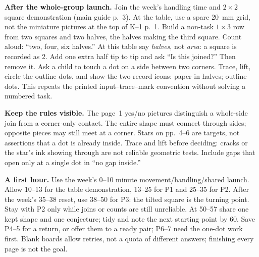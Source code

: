 \documentclass[11pt]{article}
\newcommand{\dotgrid}[2]{\foreach \x in {0,...,#1}{\foreach \y in {0,...,#2}{\fill (\x,\y) circle (1.25pt);}}}
\begin{document}
\textbf{After the whole-group launch.} Join the week's handling time and $2\times2$ square demonstration (main guide p.~3). At the table, use a spare 20~mm grid, not the miniature pictures at the top of K--1 p.~1. Build a non-task $1\times3$ row from two squares and two halves, the halves making the third square. Count aloud: ``two, four, six halves.'' At this table say \emph{halves}, not \emph{area}: a square is recorded as 2. Add one extra half tip to tip and ask ``Is this joined?'' Then remove it. Ask a child to touch a dot on a side between two corners. Trace, lift, circle the outline dots, and show the two record icons: paper in halves; outline dots. This repeats the printed input--trace--mark convention without solving a numbered task.
\begin{center}
\end{center}
\textbf{Keep the rules visible.} The page~1 yes/no pictures distinguish a whole-side join from a corner-only contact. The entire shape must connect through sides; opposite pieces may still meet at a corner. Stars on pp.~4--6 are targets, not assertions that a dot is already inside. Trace and lift before deciding: cracks or the star's ink showing through are not reliable geometric tests. Include gaps that open only at a single dot in ``no gap inside.''

\textbf{A first hour.} Use the week's 0--10 minute movement/handling/shared launch. Allow 10--13 for the table demonstration, 13--25 for P1 and 25--35 for P2. After the week's 35--38 reset, use 38--50 for P3: the tilted square is the turning point. Stay with P2 only while joins or counts are still unreliable. At 50--57 share one kept shape and one conjecture; tidy and note the next starting point by 60. Save P4--5 for a return, or offer them to a ready pair; P6--7 need the one-dot work first. Blank boards allow retries, not a quota of different answers; finishing every page is not the goal.
\end{document}
